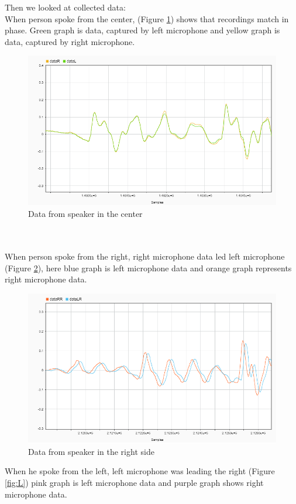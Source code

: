 Then we looked at collected data:\\
When person spoke from the center, (Figure \ref{fig:C}) shows that recordings match in phase. Green graph is 
data, captured by left microphone and yellow graph is data, captured by right microphone.
\begin{figure}[htp]
  \centering
  \includegraphics[width=0.75\linewidth]{Illustrations/DataC.png}
  \caption{Data from speaker in the center}
  \label{fig:C}
\end{figure}
\\
\\

When person spoke from the right, right microphone data led left microphone (Figure \ref{fig:R}), here blue graph is left microphone data and orange graph represents right microphone data.\\
\begin{figure}[htp]
  \centering
  \includegraphics[width=0.75\linewidth]{Illustrations/DataR.png}
  \caption{Data from speaker in the right side}
  \label{fig:R}
\end{figure}

When he spoke from the left, left microphone was leading the right (Figure \ref{fig:L}) pink graph is left microphone data and purple graph shows right microphone data.\\

